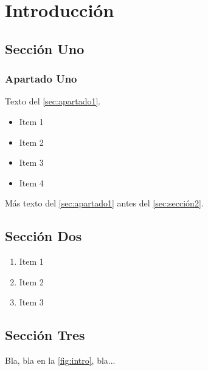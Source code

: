 \chapter{Introducción}
\label{ch:intro}

\section{Sección Uno}
\subsection{Apartado Uno}
\label{sec:apartado1}

\noindent Texto del \autoref{sec:apartado1}. \lipsum[1]

\begin{itemize}
    \item Item 1
    \item Item 2
    \item Item 3
    \item Item 4
\end{itemize}

Más texto del \autoref{sec:apartado1} antes del \autoref{sec:sección2}. \lipsum[2]

\section{Sección Dos}
\label{sec:sección2}

\begin{enumerate}
    \item Item 1
    \item Item 2
    \item Item 3
\end{enumerate}

\section{Sección Tres}

\noindent Bla, bla en la \autoref{fig:intro}, bla... \lipsum[3]

